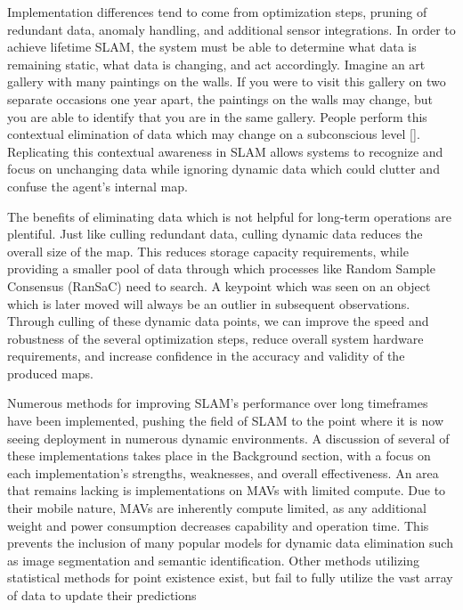 Implementation differences tend to come from optimization steps, pruning of redundant data, anomaly handling, and additional sensor integrations. In order to achieve lifetime SLAM, the system must be able to determine what data is remaining static, what data is changing, and act accordingly. Imagine an art gallery with many paintings on the walls. If you were to visit this gallery on two separate occasions one year apart, the paintings on the walls may change, but you are able to identify that you are in the same gallery. People perform this contextual elimination of data which may change on a subconscious level []. Replicating this contextual awareness in SLAM allows systems to recognize and focus on unchanging data while ignoring dynamic data which could clutter and confuse the agent's internal map.

The benefits of eliminating data which is not helpful for long-term operations are plentiful. Just like culling redundant data, culling dynamic data reduces the overall size of the map. This reduces storage capacity requirements, while providing a smaller pool of data through which processes like Random Sample Consensus (RanSaC) need to search. A keypoint which was seen on an object which is later moved will always be an outlier in subsequent observations. Through culling of these dynamic data points, we can improve the speed and robustness of the several optimization steps, reduce overall system hardware requirements, and increase confidence in the accuracy and validity of the produced maps.

Numerous methods for improving SLAM's performance over long timeframes have been implemented, pushing the field of SLAM to the point where it is now seeing deployment in numerous dynamic environments. A discussion of several of these implementations takes place in the Background section, with a focus on each implementation's strengths, weaknesses, and overall effectiveness. An area that remains lacking is implementations on MAVs with limited compute. Due to their mobile nature, MAVs are inherently compute limited, as any additional weight and power consumption decreases capability and operation time. This prevents the inclusion of many popular models for dynamic data elimination such as image segmentation and semantic identification. Other methods utilizing statistical methods for point existence exist, but fail to fully utilize the vast array of data to update their predictions